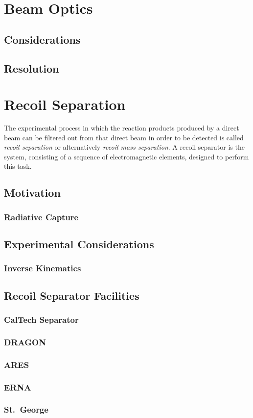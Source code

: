 \section{Beam Optics}
\label{sec:ch01-beam-optics}
\subsection{Considerations}
\subsection{Resolution}


\section{Recoil Separation}
\label{sec:ch01-recoil-separation}

The experimental process in which the reaction products produced by a direct
beam can be filtered out from that direct beam in order to be detected is
called \emph{recoil separation} or alternatively \emph{recoil mass separation}.
A recoil separator is the system, consisting of a sequence of electromagnetic
elements, designed to perform this task.

\subsection{Motivation}
\subsubsection{Radiative Capture}
\subsection{Experimental Considerations}
\subsubsection{Inverse Kinematics}
\subsection{Recoil Separator Facilities}
\subsubsection{CalTech Separator}
\subsubsection{DRAGON}
\subsubsection{ARES}
\subsubsection{ERNA}
\subsubsection{St.\ George}
